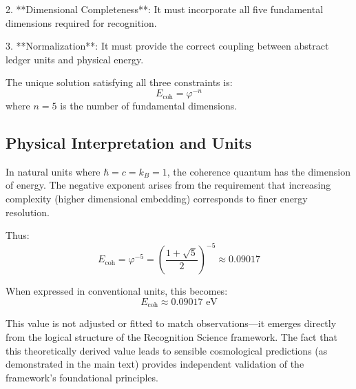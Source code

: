 \documentclass[11pt,a4paper]{article}
\theoremstyle{definition}
\theoremstyle{remark}
\begin{document}
2. **Dimensional Completeness**: It must incorporate all five fundamental dimensions required for recognition.

3. **Normalization**: It must provide the correct coupling between abstract ledger units and physical energy.

The unique solution satisfying all three constraints is:
\begin{equation}
    E_{\text{coh}} = \varphi^{-n}
\end{equation}
where \(n = 5\) is the number of fundamental dimensions.

\subsection{Physical Interpretation and Units}

In natural units where \(\hbar = c = k_B = 1\), the coherence quantum has the dimension of energy. The negative exponent arises from the requirement that increasing complexity (higher dimensional embedding) corresponds to finer energy resolution.

Thus:
\begin{equation}
    E_{\text{coh}} = \varphi^{-5} = \left(\frac{1 + \sqrt{5}}{2}\right)^{-5} \approx 0.09017
\end{equation}

When expressed in conventional units, this becomes:
\begin{equation}
    E_{\text{coh}} \approx 0.09017 \text{ eV}
\end{equation}

This value is not adjusted or fitted to match observations—it emerges directly from the logical structure of the Recognition Science framework. The fact that this theoretically derived value leads to sensible cosmological predictions (as demonstrated in the main text) provides independent validation of the framework's foundational principles.
\end{document}
